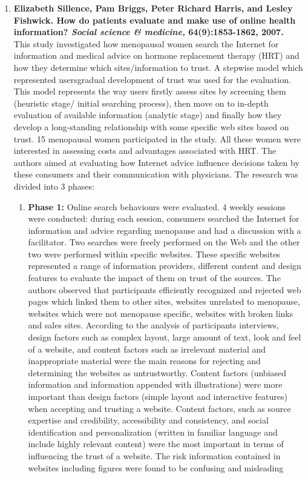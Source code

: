 \documentclass[]{article}
\begin{document}
\begin{enumerate}
\item {\textbf{Elizabeth Sillence, Pam Briggs, Peter Richard Harris, and Lesley Fishwick. How do patients evaluate and make use of online health information? \textit{Social science \& medicine,} 64(9):1853-1862, 2007.}}\\ 

This study investigated how menopausal women search the Internet for information and medical advice on hormone replacement therapy (HRT) and how they determine which sites/information to trust. A stepwise model which represented users\textquotesingle gradual development of trust was used for the evaluation. This model represents the way users firstly assess sites by screening them (heuristic stage/ initial searching process), then move on to in-depth evaluation of available information (analytic stage) and finally how they develop a long-standing relationship with some specific web sites based on trust. 15 menopausal women participated in the study. All these women were interested in assessing costs and advantages associated with HRT. The authors aimed at evaluating how Internet advice influence decisions taken by these consumers and their communication with physicians. The research was divided into 3 phases:

\begin{enumerate}
		\item \textbf{Phase 1:} Online search behaviours were evaluated. 4 weekly sessions were conducted: during each session, consumers searched the Internet for information and advice regarding menopause and had a discussion with a facilitator. Two searches were freely performed on the Web and the other two were performed within specific websites. These specific websites represented a range of information providers, different content and design features to evaluate the impact of them on trust of the sources. The authors observed that participants efficiently recognized and rejected web pages which linked them to other sites, websites unrelated to menopause, websites which were not menopause specific, websites with broken links and sales sites. According to the analysis of participants interviews, design factors such as complex layout, large amount of text, look and feel of a website, and content factors such as irrelevant material and inappropriate material were the main reasons for rejecting and determining the websites as untrustworthy. Content factors (unbiased information and information appended with illustrations) were more important than design factors (simple layout and interactive features) when accepting and trusting a website. Content factors, such as source expertise and credibility, accessibility and consistency, and social identification and personalization (written in familiar language and include highly relevant content) were the most important in terms of influencing the trust of a website. The risk information contained in websites including figures were found to be confusing and misleading
		

\end{enumerate}
\end{enumerate}
\end{document}
